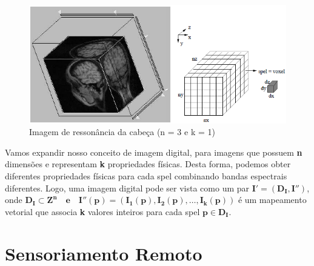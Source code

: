 \documentclass[12pt, a4paper]{article}
\begin{document}
    \begin{figure}[!htb]
    	\centering
    	\includegraphics{Screenshot_4}
    	\caption{Imagem de ressonância da cabeça (n = 3 e k = 1)}
    	\label{figRotulo}
  	\end{figure}
    \vspace{3mm}
    Vamos expandir nosso conceito de imagem digital, para imagens que possuem \textbf{n} dimensões e representam \textbf{k} propriedades físicas. Desta forma, podemos obter diferentes propriedades físicas para cada spel combinando bandas espectrais diferentes. Logo, uma imagem digital pode ser vista como um par $\mathbf{I'= (D_I, I'')}
$, onde $\mathbf{D_I \subset Z^n\quad\mbox{e}\quad I''(p)=(I_1(p),I_2(p),\dots,I_k(p))}$ é um mapeamento vetorial que associa \textbf{k} valores
inteiros para cada spel $\mathbf{p \in D_I}$.
    
    \section{Sensoriamento Remoto}
\end{document}
